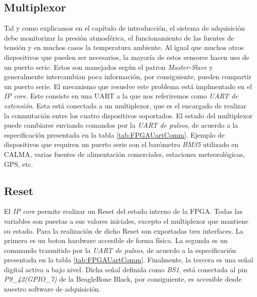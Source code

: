 	\subsection{Multiplexor}
		Tal y como explicamos en el capítulo de introducción, el sistema de adquisición debe monitorizar la presión atmosférica, el
		funcionamiento de las fuentes de tensión y en muchos casos la temperatura ambiente. Al igual que muchos otros dispositivos que pueden
		ser necesarios, la mayoría de estos sensores hacen uso de un puerto serie. Estos son manejados según el patron \emph{Master-Slave} y
		generalmente intercambian poca información, por consiguiente, pueden compartir un puerto serie. El mecanismo que resuelve este
		problema está implmentado en el \emph{IP core}. Este consiste en una UART a la que nos referiremos como \emph{UART de extensión}. Esta
		está conectada a un multiplexor, que es el encargado de realizar la conmutación entre los cuatro dispositivos soportados. El estado
		del multiplexor puede cambiarse enviando comandos por la \emph{UART de pulsos}, de acuerdo a la especificación presentada en la tabla
		\ref{tab:FPGAUartComm}. Ejemplo de dispositivos que requiren un puerto serie son el barómetro \emph{BM35} utilizado en CALMA, varias
		fuentes de alimentación comerciales, estaciones meteorológicas, GPS, etc.
	\subsection{Reset}
		El \emph{IP core} permite realizar un Reset del estado interno de la FPGA. Todas las variables son puestas a sus valores iniciales,
		excepto el multiplexor que mantiene su estado. Para la realización de dicho Reset son exportadas tres interfaces. La primera es un
		boton hardware accesible de forma física. La segunda es un commando trasmitido por la \emph{UART de pulsos}, de acuerdo a la
		especificación presentada en la tabla \ref{tab:FPGAUartComm}. Finalmente, la tercera es una señal digital activa a bajo nivel. Dicha
		señal definida como \emph{BS1}, está conectada al pin \emph{P9\_42(GPIO\_7)} de la BeagleBone Black, por consiguiente, es accesible
		desde nuestro software de adquisición.
